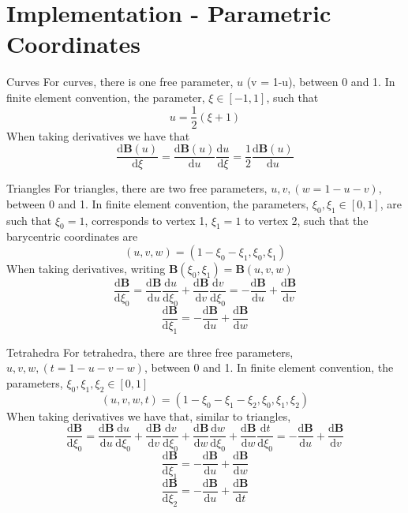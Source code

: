\documentclass[12pt]{beamer}
\begin{document}
\section{Implementation - Parametric Coordinates}
\begin{frame}{Curves}
For curves, there is one free parameter, $u$ (v = 1-u), between 0 and 1. In finite element convention, the parameter, $\xi \in [-1,1]$, such that
\[ u = \frac{1}{2}(\xi+1)\]
When taking derivatives we have that
\[ \frac{\mathrm{d} \mathbf{B}(u)}{\mathrm{d} \xi}  =  \frac{\mathrm{d} \mathbf{B}(u)}{\mathrm{d} u}\frac{\mathrm{d} u}{\mathrm{d} \xi} = \frac{1}{2}\frac{\mathrm{d} \mathbf{B}(u)}{\mathrm{d} u}
\]

\end{frame}
\begin{frame}{Triangles}
For triangles, there are two free parameters, $u,v,(w = 1-u-v)$, between 0 and 1. In finite element convention, the parameters, $\xi_0,\xi_1 \in [0,1]$, are such that 
$\xi_0 = 1$, corresponds to vertex 1, $\xi_1 = 1$ to vertex 2, such that the barycentric coordinates are
\[(u,v,w) = (1-\xi_0-\xi_1,\xi_0,\xi_1)\]
When taking derivatives, writing $\mathbf{B}(\xi_0,\xi_1) = \mathbf{B}(u,v,w)$
{
  \footnotesize
\[ \frac{\mathrm{d} \mathbf{B}}{\mathrm{d} \xi_0}  =  \frac{\mathrm{d} \mathbf{B}}{\mathrm{d} u}\frac{\mathrm{d} u}{\mathrm{d} \xi_0} + \frac{\mathrm{d} \mathbf{B}}{\mathrm{d} v}\frac{\mathrm{d} v}{\mathrm{d} \xi_0} = -\frac{\mathrm{d} \mathbf{B}}{\mathrm{d} u}+\frac{\mathrm{d} \mathbf{B}}{\mathrm{d} v}
\]
\[ \frac{\mathrm{d} \mathbf{B}}{\mathrm{d} \xi_1} = -\frac{\mathrm{d} \mathbf{B}}{\mathrm{d} u}+\frac{\mathrm{d} \mathbf{B}}{\mathrm{d} w}
\]
}
\end{frame}
\begin{frame}{Tetrahedra}
For tetrahedra, there are three free parameters, $u,v,w,(t = 1-u-v-w)$, between 0 and 1. In finite element convention, the parameters, $\xi_0,\xi_1,\xi_2 \in [0,1]$
\[(u,v,w,t) = (1-\xi_0-\xi_1-\xi_2,\xi_0,\xi_1,\xi_2)\]
When taking derivatives we have that, similar to triangles,
{
  \footnotesize
\[ \frac{\mathrm{d} \mathbf{B}}{\mathrm{d} \xi_0}  =  \frac{\mathrm{d} \mathbf{B}}{\mathrm{d} u}\frac{\mathrm{d} u}{\mathrm{d} \xi_0} + \frac{\mathrm{d} \mathbf{B}}{\mathrm{d} v}\frac{\mathrm{d} v}{\mathrm{d} \xi_0} + \frac{\mathrm{d} \mathbf{B}}{\mathrm{d} w}\frac{\mathrm{d} w}{\mathrm{d} \xi_0}+ \frac{\mathrm{d} \mathbf{B}}{\mathrm{d} w}\frac{\mathrm{d} t}{\mathrm{d} \xi_0} = -\frac{\mathrm{d} \mathbf{B}}{\mathrm{d} u}+\frac{\mathrm{d} \mathbf{B}}{\mathrm{d} v}
\]
\[ \frac{\mathrm{d} \mathbf{B}}{\mathrm{d} \xi_1} = -\frac{\mathrm{d} \mathbf{B}}{\mathrm{d} u}+\frac{\mathrm{d} \mathbf{B}}{\mathrm{d} w} 
\]
\[ \frac{\mathrm{d} \mathbf{B}}{\mathrm{d} \xi_2} = -\frac{\mathrm{d} \mathbf{B}}{\mathrm{d} u}+\frac{\mathrm{d} \mathbf{B}}{\mathrm{d} t}
\]
}
\end{frame}
\end{document}
